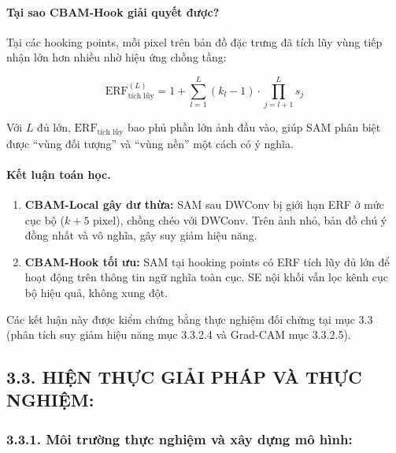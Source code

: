 \documentclass[
]{article}
\begin{document}
\paragraph{Tại sao CBAM-Hook giải quyết được?}

Tại các hooking points, mỗi pixel trên bản đồ đặc trưng đã tích lũy vùng tiếp nhận lớn hơn nhiều nhờ hiệu ứng chồng tầng:

\begin{equation}
\text{ERF}_{\text{tích lũy}}^{(L)} = 1 + \sum_{l=1}^{L} (k_l - 1) \cdot \prod_{j=l+1}^{L} s_j
\label{eq:cumulative-erf}
\end{equation}

Với $L$ đủ lớn, $\text{ERF}_{\text{tích lũy}}$ bao phủ phần lớn ảnh đầu vào, giúp SAM phân biệt được ``vùng đối tượng'' và ``vùng nền'' một cách có ý nghĩa.

\paragraph{Kết luận toán học.}

\begin{enumerate}
\item \textbf{CBAM-Local gây dư thừa:} SAM sau DWConv bị giới hạn ERF ở mức cục bộ ($k + 5$ pixel), chồng chéo với DWConv. Trên ảnh nhỏ, bản đồ chú ý đồng nhất và vô nghĩa, gây suy giảm hiệu năng.

\item \textbf{CBAM-Hook tối ưu:} SAM tại hooking points có ERF tích lũy đủ lớn để hoạt động trên thông tin ngữ nghĩa toàn cục. SE nội khối vẫn lọc kênh cục bộ hiệu quả, không xung đột.
\end{enumerate}

Các kết luận này được kiểm chứng bằng thực nghiệm đối chứng tại mục 3.3 (phân tích suy giảm hiệu năng mục 3.3.2.4 và Grad-CAM mục 3.3.2.5).

\subsection{3.3. HIỆN THỰC GIẢI PHÁP VÀ THỰC NGHIỆM:}\label{hiux1ec7n-thux1ef1c-giux1ea3i-phuxe1p}

\subsubsection{3.3.1. Môi trường thực nghiệm và xây dựng mô hình:}\label{muxf4i-trux1b0ux1eddng-thux1ef1c-nghiux1ec7m-vuxe0-xuxe2y-dux1ef1ng-muxf4-huxecnh}
\end{document}
